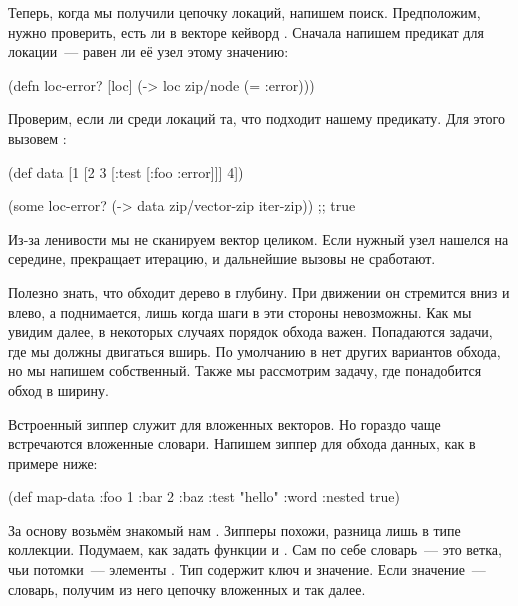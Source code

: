 Теперь, когда мы получили цепочку локаций, напишем поиск. Предположим, нужно
проверить, есть ли в векторе кейворд . Сначала напишем предикат для
локации~--- равен ли её узел этому значению:

\begin{english}
  \begin{clojure}
(defn loc-error? [loc]
  (-> loc zip/node (= :error)))
  \end{clojure}
\end{english}

Проверим, если ли среди локаций та, что подходит нашему предикату.  Для этого
вызовем :

\begin{english}
  \begin{clojure}
(def data
  [1 [2 3 [:test [:foo :error]]] 4])

(some loc-error? (-> data
                     zip/vector-zip
                     iter-zip))
;; true
  \end{clojure}
\end{english}

Из-за ленивости мы не сканируем вектор целиком. Если нужный узел нашелся на
середине,  прекращает итерацию, и дальнейшие вызовы  не
сработают.

Полезно знать, что  обходит дерево в глубину. При движении он
стремится вниз и влево, а поднимается, лишь когда шаги в эти стороны
невозможны. Как мы увидим далее, в некоторых случаях порядок обхода
важен. Попадаются задачи, где мы должны двигаться вширь. По умолчанию в
 нет других вариантов обхода, но мы напишем собственный. Также мы
рассмотрим задачу, где понадобится обход в ширину.


Встроенный зиппер  служит для вложенных векторов. Но гораздо
чаще встречаются вложенные словари. Напишем зиппер для обхода данных, как в
примере ниже:

\begin{english}
  \begin{clojure}
(def map-data
  {:foo 1
   :bar 2
   :baz {:test "hello"
         :word {:nested true}}})
  \end{clojure}
\end{english}

За основу возьмём знакомый нам . Зипперы похожи, разница лишь в
типе коллекции. Подумаем, как задать функции  и
. Сам по себе словарь~--- это ветка, чьи потомки~--- элементы
. Тип  содержит ключ и значение. Если значение~---
словарь, получим из него цепочку вложенных  и так далее.

